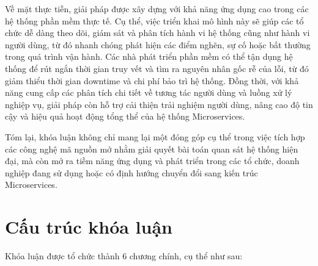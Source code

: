 \documentclass{uetgraduation}
\begin{document}
Về mặt thực tiễn, giải pháp được xây dựng với khả năng ứng dụng cao trong các hệ thống phần mềm thực tế. Cụ thể, việc triển khai mô hình này sẽ giúp các tổ chức dễ dàng theo dõi, giám sát và phân tích hành vi hệ thống cũng như hành vi người dùng, từ đó nhanh chóng phát hiện các điểm nghẽn, sự cố hoặc bất thường trong quá trình vận hành. Các nhà phát triển phần mềm có thể tận dụng hệ thống để rút ngắn thời gian truy vết và tìm ra nguyên nhân gốc rễ của lỗi, từ đó giảm thiểu thời gian downtime và chi phí bảo trì hệ thống. Đồng thời, với khả năng cung cấp các phân tích chi tiết về tương tác người dùng và luồng xử lý nghiệp vụ, giải pháp còn hỗ trợ cải thiện trải nghiệm người dùng, nâng cao độ tin cậy và hiệu quả hoạt động tổng thể của hệ thống Microservices.

Tóm lại, khóa luận không chỉ mang lại một đóng góp cụ thể trong việc tích hợp các công nghệ mã nguồn mở nhằm giải quyết bài toán quan sát hệ thống hiện đại, mà còn mở ra tiềm năng ứng dụng và phát triển trong các tổ chức, doanh nghiệp đang sử dụng hoặc có định hướng chuyển đổi sang kiến trúc Microservices.

\section{Cấu trúc khóa luận}
Khóa luận được tổ chức thành 6 chương chính, cụ thể như sau:
\end{document}
